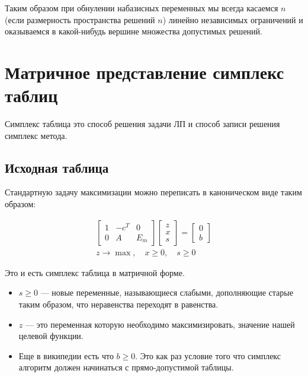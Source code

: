 \documentclass[a4paper,article,14pt]{extarticle}
\begin{document}
Таким образом при обнулении набазисных переменных мы всегда касаемся \(n\) (если размерность пространства решений \(n\)) линейно независимых ограничений и оказываемся в какой-нибудь вершине множества допустимых решений.

\section{Матричное представление симплекс таблиц}

Симплекс таблица это способ решения задачи ЛП и способ записи решения симплекс метода.

\subsection{Исходная таблица}

Стандартную задачу максимизации можно переписать в каноническом виде таким образом:

\begin{equation} \label{eq:matrix_form_1_phaze}
    \begin{gathered}
        \begin{bmatrix}
            1 & -c^T & 0 \\
            0 & A & E_m
        \end{bmatrix}
        \begin{bmatrix}
            z \\ x \\ s
        \end{bmatrix}
        =
        \begin{bmatrix}
            0 \\ b
        \end{bmatrix}
        \\
        z \rightarrow \max, \quad x \ge 0, \quad s \ge 0
    \end{gathered}
\end{equation}

Это и есть симплекс таблица в матричной форме.

\begin{itemize}
    \item \(s \ge 0\) --- новые переменные, называющиеся слабыми, дополняющие старые таким образом, что неравенства переходят в равенства.
    \item \(z\) --- это переменная которую необходимо максимизировать, значение нашей целевой функции.
    \item
        Еще в википедии есть что \(b \ge 0\).
        Это как раз условие того что симплекс алгоритм должен начинаться с прямо-допустимой таблицы.
\end{itemize}
\end{document}
